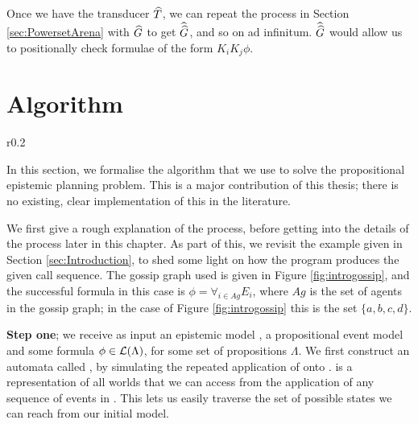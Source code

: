 \documentclass[10pt, a4paper]{report}
\begin{document}
Once we have the transducer $\widehat{T}$, we can repeat the process in Section
\ref{sec:PowersetArena} with $\widehat{G}$ to get $\widehat{\widehat{G}}$, and so on ad
infinitum. $\widehat{\widehat{G}}$ would allow us to positionally check formulae of the
form $K_i K_j \phi$.

\newpage

\chapter{Algorithm}

\begin{wrapfigure}{r}{0.2\textwidth}
  \centering
  \caption{}
  \label{fig:introgossip}
\end{wrapfigure}

In this section, we formalise the algorithm that we use to solve the
propositional epistemic planning problem. This is a major contribution of this
thesis; there is no existing, clear implementation of this in the literature.

We first give a rough explanation of the process, before getting into the
details of the process later in this chapter. As part of this, we revisit the
example given in Section \ref{sec:Introduction}, to shed some light on how the
program produces the given call sequence. The gossip graph used is given in
Figure \ref{fig:introgossip}, and the successful formula in this case is $\phi =
\forall_{i \in Ag} E_i$, where $Ag$ is the set of agents in the gossip graph; in
the case of Figure \ref{fig:introgossip} this is the set $\{a, b, c, d\}$. 

\textbf{Step one}; we receive as input an epistemic model , a
propositional event model  and some formula $\phi \in \mathcal{L}(\Lambda)$,
for some set of propositions $\Lambda$. We first construct an automata called
\mestar, by simulating the repeated application of  onto . \mestar
is a representation of all worlds that we can access from the application of any
sequence of events in . This lets us easily traverse the set of possible
states we can reach from our initial model.
\end{document}
